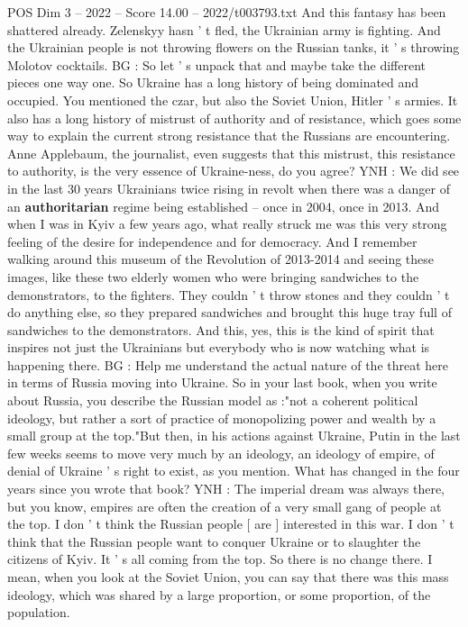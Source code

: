 \begin{textsample}{POS Dim 3 – 2022 – Score 14.00 – 2022/t003793.txt}
And this fantasy has been shattered already.
Zelenskyy hasn ' t fled, the Ukrainian army is fighting.
And the Ukrainian people is not throwing flowers on the Russian tanks, it ' s throwing Molotov cocktails.
BG : So let ' s unpack that and maybe take the different pieces one way one.
So Ukraine has a long history of being dominated and occupied.
You mentioned the czar, but also the Soviet Union, Hitler ' s armies.
It also has a long history of mistrust of authority and of resistance, which goes some way to explain the current strong resistance that the Russians are encountering.
Anne Applebaum, the journalist, even suggests that this mistrust, this resistance to authority, is the very essence of Ukraine-ness, do you agree?
YNH : We did see in the last 30 years Ukrainians twice rising in revolt when there was a danger of an \textbf{authoritarian} regime being established -- once in 2004, once in 2013.
And when I was in Kyiv a few years ago, what really struck me was this very strong feeling of the desire for independence and for democracy.
And I remember walking around this museum of the Revolution of 2013-2014 and seeing these images, like these two elderly women who were bringing sandwiches to the demonstrators, to the fighters.
They couldn ' t throw stones and they couldn ' t do anything else, so they prepared sandwiches and brought this huge tray full of sandwiches to the demonstrators.
And this, yes, this is the kind of spirit that inspires not just the Ukrainians but everybody who is now watching what is happening there.
BG : Help me understand the actual nature of the threat here in terms of Russia moving into Ukraine.
So in your last book, when you write about Russia, you describe the Russian model as :"not a coherent political ideology, but rather a sort of practice of monopolizing power and wealth by a small group at the top."But then, in his actions against Ukraine, Putin in the last few weeks seems to move very much by an ideology, an ideology of empire, of denial of Ukraine ' s right to exist, as you mention.
What has changed in the four years since you wrote that book?
YNH : The imperial dream was always there, but you know, empires are often the creation of a very small gang of people at the top.
I don ' t think the Russian people [ are ] interested in this war.
I don ' t think that the Russian people want to conquer Ukraine or to slaughter the citizens of Kyiv.
It ' s all coming from the top.
So there is no change there.
I mean, when you look at the Soviet Union, you can say that there was this mass ideology, which was shared by a large proportion, or some proportion, of the population.

\end{textsample}
